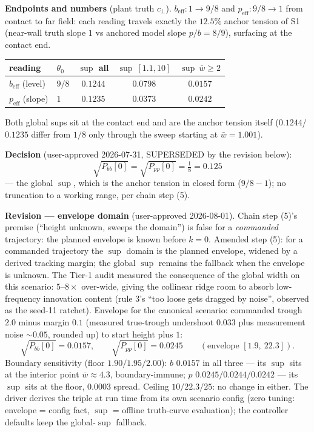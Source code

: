 \documentclass[11pt,a4paper,fontset=none]{ctexart}
\begin{document}
\textbf{Endpoints and numbers} (plant truth $c_\perp$).
$b_{\mathrm{eff}}: 1 \to 9/8$ and $p_{\mathrm{eff}}: 9/8 \to 1$ from
contact to far field: each reading travels exactly the $12.5\%$ anchor
tension of S1 (near-wall truth slope $1$ vs anchored model slope
$p/b = 8/9$), surfacing at the contact end.
\begin{center}
\begin{tabular}{llccc}
\toprule
reading & $\theta_0$ & $\sup$ all & $\sup\ [1.1,10]$ &
  $\sup\ \bar{w}\geq 2$ \\
\midrule
$b_{\mathrm{eff}}$ (level) & $9/8$ & $0.1244$ & $0.0798$ & $0.0157$ \\
$p_{\mathrm{eff}}$ (slope) & $1$   & $0.1235$ & $0.0373$ & $0.0242$ \\
\bottomrule
\end{tabular}
\end{center}
Both global sups sit at the contact end and are the anchor tension
itself ($0.1244$/$0.1235$ differ from $1/8$ only through the sweep
starting at $\bar{w} = 1.001$).

\textbf{Decision} (user-approved 2026-07-31, SUPERSEDED by the revision
below):
\begin{equation*}
\sqrt{P_{bb}[0]} = \sqrt{P_{pp}[0]} = \tfrac{1}{8} = 0.125
\end{equation*}
--- the global $\sup$, which is the anchor tension in closed form
($9/8 - 1$); no truncation to a working range, per chain step (5).

\textbf{Revision --- envelope domain} (user-approved 2026-08-01).
Chain step (5)'s premise (``height unknown, sweeps the domain'') is
false for a \emph{commanded} trajectory: the planned envelope is known
before $k=0$.  Amended step (5): for a commanded trajectory the $\sup$
domain is the planned envelope, widened by a derived tracking margin;
the global $\sup$ remains the fallback when the envelope is unknown.
The Tier-1 audit measured the consequence of the global width on this
scenario: $5$--$8\times$ over-wide, giving the collinear ridge room to
absorb low-frequency innovation content (rule 3's ``too loose gets
dragged by noise'', observed as the seed-11 ratchet).  Envelope for the
canonical scenario: commanded trough $2.0$ minus margin $0.1$ (measured
true-trough undershoot $0.033$ plus measurement noise $\sim 0.05$,
rounded up) to start height plus $1$:
\begin{equation*}
\sqrt{P_{bb}[0]} = 0.0157, \qquad \sqrt{P_{pp}[0]} = 0.0245
\qquad (\text{envelope } [1.9,\ 22.3]).
\end{equation*}
Boundary sensitivity (floor $1.90/1.95/2.00$): $b$ $0.0157$ in all
three --- its $\sup$ sits at the interior point $\bar{w}\approx 4.3$,
boundary-immune; $p$ $0.0245/0.0244/0.0242$ --- its $\sup$ sits at the
floor, $0.0003$ spread.  Ceiling $10/22.3/25$: no change in either.
The driver derives the triple at run time from its own scenario config
(zero tuning: envelope = config fact, $\sup$ = offline truth-curve
evaluation); the controller defaults keep the global-$\sup$ fallback.
\end{document}
